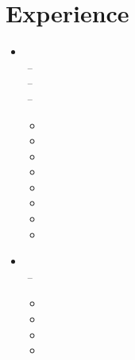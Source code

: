 \documentclass[11pt,a4paper]{article}
\begin{document}
\section{Experience}
\begin{itemize}[leftmargin=0pt,label={},itemsep=2em]  %
\item \parbox{\textwidth}{\textbf{\KhonraadName} \hfill \textit{\KhonraadLocation}}\\[2pt]
\textit{\KhonraadThirdJobTitle} \hfill \textit{\KhonraadThirdJobStart\,--\,\KhonraadThirdJobEnd}\\[2pt]
\textit{\KhonraadSecondJobTitle} \hfill \textit{\KhonraadSecondJobStart\,--\,\KhonraadSecondJobEnd}\\[2pt]
\textit{\KhonraadFirstJobTitle} \hfill \textit{\KhonraadFirstJobStart\,--\,\KhonraadFirstJobEnd}\\[1pt]
\begin{itemize}[leftmargin=*,topsep=0pt,parsep=0pt,partopsep=0pt]
    \item \KhonraadChatbots
    \item \KhonraadLifecycle
    \item \KhonraadMobile
    \item \KhonraadAndroid
    \item \KhonraadMPS
    \item \KhonraadJava
    \item \KhonraadLaws
    \item \KhonraadHaskell
\end{itemize} 

\item \parbox{\textwidth}{\textbf{\McfunshineName} \hfill \textit{\McfunshineLocation}}\\[2pt]
\textit{\McfunshineJobTitle} \hfill \textit{\McfunshineJobStart\,--\,\McfunshineJobEnd}\\[1pt]
\begin{itemize}[leftmargin=*,topsep=0pt,parsep=0pt,partopsep=0pt]
    \item \McfunshinePodmorph
    \item \McfunshinePodmorphAI
    \item \McfunshinePodmorphCloud
    \item \McfunshinePodmorphBaker
\end{itemize}


\end{itemize}
\end{document}

